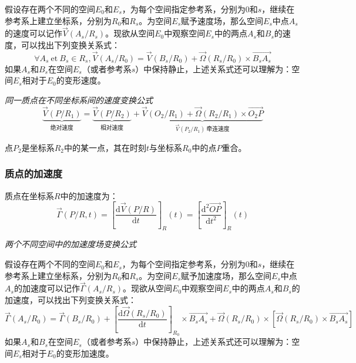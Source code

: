 \documentclass[UTF8]{ctexart}%
\begin{document}
假设存在两个不同的空间$E_0$和$E_s$，为每个空间指定参考系，分别为$0$和$s$，继续在参考系上建立坐标系，分别为$R_0$和$R_s$。为空间$E_s$赋予速度场，那么空间$E_s$中点$A_s$的速度可以记作$\overrightarrow{V}\left(A_s/R_s\right)$。现欲从空间$E_0$中观察空间$E_s$中的两点$A_s$和$B_s$的速度，可以找出下列变换关系式：
\begin{equation}
\forall A_s\ \text{et}\  B_s \in R_s, \overrightarrow{V}\left(A_s/R_0\right)=\overrightarrow{V}\left(B_s/R_0\right)+\overrightarrow{\Omega}\left(R_s/R_0\right)\times \overrightarrow{B_sA_s}
\end{equation}
如果$A_s$和$B_s$在空间$E_s$（或者参考系$s$）中保持静止，上述关系式还可以理解为：空间$E_s$相对于$E_0$的变形速度。

\emph{同一质点在不同坐标系间的速度变换公式}
\begin{equation}
\underbrace{\overrightarrow{V}\left(P/R_1\right)}_{\text{绝对速度}}=\underbrace{\overrightarrow{V}\left(P/R_2\right)}_{\text{相对速度}}+\underbrace{\overrightarrow{V}\left(O_2/R_1\right)+\overrightarrow{\Omega}\left(R_2/R_1\right)\times\overrightarrow{O_2P}}_{\overrightarrow{V}\left(P_2/R_1\right)\ \text{牵连速度}}
\end{equation}

点$P_2$是坐标系$R_2$中的某一点，其在时刻$t$与坐标系$R_0$中的点$P$重合。

\subsubsection{质点的加速度}
\label{sec:质点的加速度}

质点在坐标系$R$中的加速度为：
\begin{equation}
\overrightarrow{\Gamma}\left(P/R, t\right)=\left[\frac{\mathrm{d}\overrightarrow{V}\left(P/R\right)}{\mathrm{d}t}\right]_R\left(t\right)=\left[\frac{\mathrm{d}^2\overrightarrow{OP}}{\mathrm{d}t^2}\right]_R\left(t\right)
\end{equation}

\emph{两个不同空间中的加速度场变换公式}

假设存在两个不同的空间$E_0$和$E_s$，为每个空间指定参考系，分别为$0$和$s$，继续在参考系上建立坐标系，分别为$R_0$和$R_s$。为空间$E_s$赋予加速度场，那么空间$E_s$中点$A_s$的加速度可以记作$\overrightarrow{\Gamma}\left(A_s/R_s\right)$。现欲从空间$E_0$中观察空间$E_s$中的两点$A_s$和$B_s$的加速度，可以找出下列变换关系式：
\begin{equation}
\overrightarrow{\Gamma}\left(A_s/R_0\right)=\overrightarrow{\Gamma}\left(B_s/R_0\right)+\left[\frac{\mathrm{d}\overrightarrow{\Omega}\left(R_s/R_0\right)}{\mathrm{d}t} \right]_{R_0}\times\overrightarrow{B_sA_s}+\overrightarrow{\Omega}\left(R_s/R_0\right)\times\left[\overrightarrow{\Omega}\left(R_s/R_0\right)\times\overrightarrow{B_sA_s}\right]
\end{equation}
如果$A_s$和$B_s$在空间$E_s$（或者参考系$s$）中保持静止，上述关系式还可以理解为：空间$E_s$相对于$E_0$的变形加速度。
\end{document}
